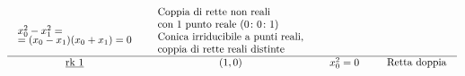 \begin{theorema}
\begin{enumerate}
\begin{equation*}
\begin{array}{ccll}
\begin{array}{l}
		\\[-1mm]
		x_0^2-x_1^2=\\[-0.75ex]
		=(x_0-x_1)(x_0+x_1)=0
		\end{array} & \begin{array}{l}
		\begin{array}{l}
		\text{Coppia di rette non reali} \\
		\text{con } 1 \text{ punto reale } (0\colon 0\colon 1)
		\end{array} \\ %
		\begin{array}{l}
		\text{Conica irriducibile a punti reali,} \\
		\text{coppia di rette reali distinte}
		\end{array}
		\end{array} \\[2mm] \hline %
		\underline{\rk 1} & (1,0) & \begin{array}{l}
			\\[-4mm]
			x_0^2=0
		\end{array} &\ \ \begin{array}{l}
		\text{Retta doppia}
	\end{array}	
\end{array}	
	\end{equation*}
	\end{enumerate}
	\end{theorema}

